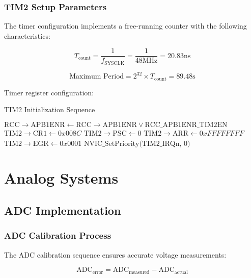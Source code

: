 \documentclass{article}
\begin{document}
\subsubsection{TIM2 Setup Parameters}

The timer configuration implements a free-running counter with the following characteristics:

\begin{equation}
T_{\text{count}} = \frac{1}{f_{\text{SYSCLK}}} = \frac{1}{48\text{MHz}} = 20.83\text{ns}
\end{equation}

\begin{equation}
\text{Maximum Period} = 2^{32} \times T_{\text{count}} = 89.48\text{s}
\end{equation}

Timer register configuration:

\begin{algorithm}[H]
\caption{TIM2 Initialization Sequence}
\begin{algorithmic}[1]
\State $\text{RCC}\rightarrow\text{APB1ENR} \gets \text{RCC}\rightarrow\text{APB1ENR} \lor \text{RCC\_APB1ENR\_TIM2EN}$
\State $\text{TIM2}\rightarrow\text{CR1} \gets 0x008C$ 
\State $\text{TIM2}\rightarrow\text{PSC} \gets 0$ 
\State $\text{TIM2}\rightarrow\text{ARR} \gets 0xFFFFFFFF$ 
\State $\text{TIM2}\rightarrow\text{EGR} \gets 0x0001$ 
\State $\text{NVIC\_SetPriority(TIM2\_IRQn, 0)}$ 
\end{algorithmic}
\end{algorithm}

\section{Analog Systems}
\subsection{ADC Implementation}
\subsubsection{ADC Calibration Process}

The ADC calibration sequence ensures accurate voltage measurements:

\begin{equation}
\text{ADC}_{\text{error}} = \text{ADC}_{\text{measured}} - \text{ADC}_{\text{actual}}
\end{equation}
\end{document}
